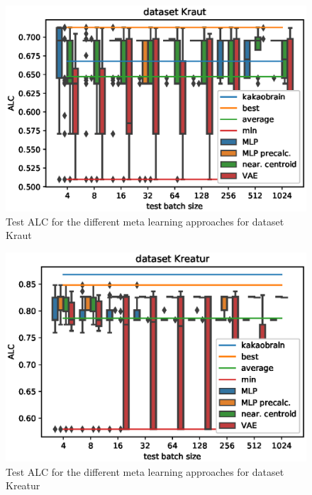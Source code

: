 \documentclass{article}
\begin{document}
\begin{figure}[H]
\begin{center}
 	\includegraphics[width=0.99\linewidth]{../figures/12.eps} 
\end{center}
\caption{Test ALC for the different meta learning approaches for dataset Kraut}
\label{fig:12}
\end{figure} 
%
\begin{figure}[H]
\begin{center}
 	\includegraphics[width=0.99\linewidth]{../figures/11.eps} 
\end{center}
\caption{Test ALC for the different meta learning approaches for dataset Kreatur}
\label{fig:11}
\end{figure} 
\end{document}
